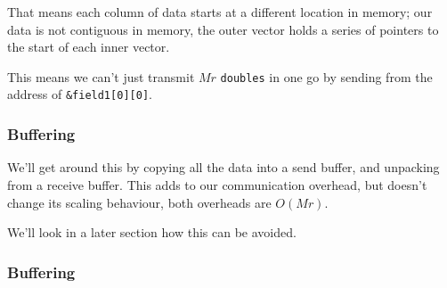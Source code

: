 That means each column of data starts at a different location in memory;
our data is not contiguous in memory, the outer vector holds a series of
pointers to the start of each inner vector.

This means we can't just transmit $Mr$ \texttt{doubles} in one go by
sending from the address of \texttt{\&field1{[}0{]}{[}0{]}}.

\subsubsection{Buffering}\label{buffering}

We'll get around this by copying all the data into a send buffer, and
unpacking from a receive buffer. This adds to our communication
overhead, but doesn't change its scaling behaviour, both overheads are
$O(Mr)$.

We'll look in a later section how this can be avoided.

\subsubsection{Buffering}\label{buffering-1}

\begin{Shaded}
\begin{Highlighting}[]

 
  \NormalTok{(} 
    \NormalTok{(} 
    \NormalTok{\}}
  \NormalTok{\}}
\NormalTok{\}}
\end{Highlighting}
\end{Shaded}

\begin{Shaded}
\begin{Highlighting}[]

 
  \NormalTok{(} 
    \NormalTok{(} 
    \NormalTok{\}}
  \NormalTok{\}}
\NormalTok{\}}
\end{Highlighting}
\end{Shaded}

